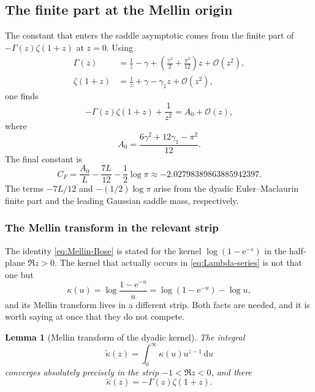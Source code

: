 \documentclass[11pt,oneside]{article}
\newtheorem{lemma}[theorem]{Lemma}
\theoremstyle{definition}
\theoremstyle{remark}
\newcommand{\e}{\mathrm e}
\newcommand{\dd}{\,\mathrm d}
\newcommand{\bigO}{\mathcal O}
\begin{document}
\subsection{The finite part at the Mellin origin}

The constant that enters the saddle asymptotic comes from the finite part of
$-\Gamma(z)\zeta(1+z)$ at $z=0$.  Using
\begin{align*}
 \Gamma(z)&=\frac1z-\gamma+
   \left(\frac{\gamma^2}{2}+\frac{\pi^2}{12}\right)z+\bigO(z^2),\\
 \zeta(1+z)&=\frac1z+\gamma-\gamma_1z+\bigO(z^2),
\end{align*}
one finds
\begin{equation}
 -\Gamma(z)\zeta(1+z)+\frac1{z^2}
 =A_0+\bigO(z),                                            \label{eq:A0-finite-part}
\end{equation}
where
\begin{equation}
 A_0=\frac{6\gamma^2+12\gamma_1-\pi^2}{12}.               \label{eq:A0}
\end{equation}
The final constant is
\begin{equation}
 C_F=\frac{A_0}{L}-\frac{7L}{12}-\frac12\log\pi
 \approx-2.02798389863885942397.                           \label{eq:CF}
\end{equation}
The terms $-7L/12$ and $-(1/2)\log\pi$ arise from the dyadic Euler--Maclaurin finite part and
the leading Gaussian saddle mass, respectively.


\subsubsection{The Mellin transform in the relevant strip}
\label{subsub:as-mellin}

The identity \eqref{eq:Mellin-Bose} is stated for the kernel $\log(1-\e^{-s})$ in the
half-plane $\Re z>0$.  The kernel that actually occurs in \eqref{eq:Lambda-series} is not
that one but
\begin{equation*}
 \kappa(u)=\log\frac{1-\e^{-u}}u=\log(1-\e^{-u})-\log u,
\end{equation*}
and its Mellin transform lives in a different strip.  Both facts are needed, and it is worth
saying at once that they do not compete.

\begin{lemma}[Mellin transform of the dyadic kernel]
\label{lem:as-mellin-kappa}
The integral
\begin{equation}
 \widetilde\kappa(z)=\int_0^{\infty}\kappa(u)u^{z-1}\dd u  \label{eq:as-mellin-kappa-def}
\end{equation}
converges absolutely precisely in the strip $-1<\Re z<0$, and there
\begin{equation}
 \widetilde\kappa(z)=-\Gamma(z)\zeta(1+z).                 \label{eq:as-mellin-kappa}
\end{equation}
\end{lemma}
\end{document}
